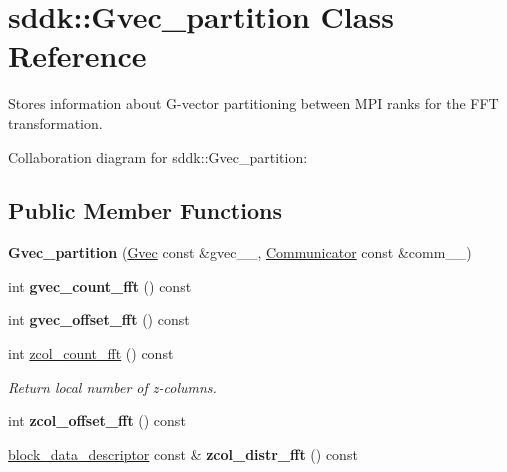 \hypertarget{classsddk_1_1_gvec__partition}{}\section{sddk\+:\+:Gvec\+\_\+partition Class Reference}
\label{classsddk_1_1_gvec__partition}


Stores information about G-\/vector partitioning between M\+P\+I ranks for the F\+F\+T transformation.  




Collaboration diagram for sddk\+:\+:Gvec\+\_\+partition\+:
\subsection*{Public Member Functions}
\begin{DoxyCompactItemize}
\item 
\hypertarget{classsddk_1_1_gvec__partition_ab74f3389da7745528053f9b044375914}{}{\bfseries Gvec\+\_\+partition} (\hyperlink{classsddk_1_1_gvec}{Gvec} const \&gvec\+\_\+\+\_\+, \hyperlink{classsddk_1_1_communicator}{Communicator} const \&comm\+\_\+\+\_\+)\label{classsddk_1_1_gvec__partition_ab74f3389da7745528053f9b044375914}

\item 
\hypertarget{classsddk_1_1_gvec__partition_a1f8d4e5f272a5e33e8cb9832680687e7}{}int {\bfseries gvec\+\_\+count\+\_\+fft} () const \label{classsddk_1_1_gvec__partition_a1f8d4e5f272a5e33e8cb9832680687e7}

\item 
\hypertarget{classsddk_1_1_gvec__partition_a86a40d02487cd53249649e65c21f7d53}{}int {\bfseries gvec\+\_\+offset\+\_\+fft} () const \label{classsddk_1_1_gvec__partition_a86a40d02487cd53249649e65c21f7d53}

\item 
int \hyperlink{classsddk_1_1_gvec__partition_a5f4fb00cd733a367cab41d607d80c1fd}{zcol\+\_\+count\+\_\+fft} () const 
\begin{DoxyCompactList}\small\item\em Return local number of z-\/columns. \end{DoxyCompactList}\item 
\hypertarget{classsddk_1_1_gvec__partition_abe3cdb7ca5ea2ede02f8315556b999bf}{}int {\bfseries zcol\+\_\+offset\+\_\+fft} () const \label{classsddk_1_1_gvec__partition_abe3cdb7ca5ea2ede02f8315556b999bf}

\item 
\hypertarget{classsddk_1_1_gvec__partition_aeed453f58a9f4e20da90ffac4f18f1eb}{}\hyperlink{structsddk_1_1block__data__descriptor}{block\+\_\+data\+\_\+descriptor} const \& {\bfseries zcol\+\_\+distr\+\_\+fft} () const \label{classsddk_1_1_gvec__partition_aeed453f58a9f4e20da90ffac4f18f1eb}


\end{DoxyCompactItemize}
